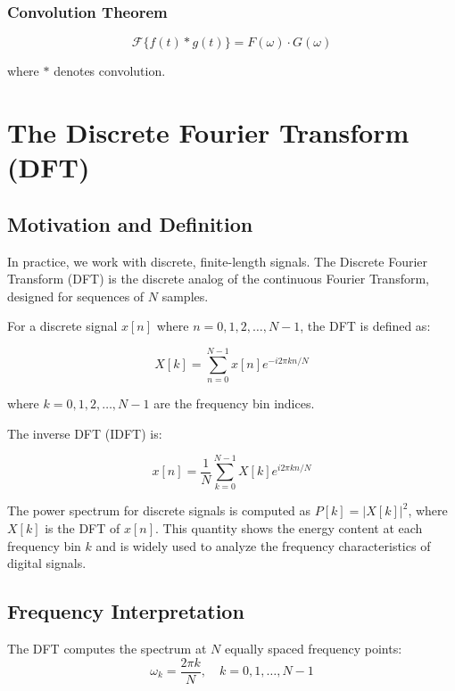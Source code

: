 \documentclass[11pt,a4paper]{article}
\begin{document}
\subsubsection{Convolution Theorem}
\begin{equation}
\mathcal{F}\{f(t) * g(t)\} = F(\omega) \cdot G(\omega)
\end{equation}

where $*$ denotes convolution.

\section{The Discrete Fourier Transform (DFT)}

\subsection{Motivation and Definition}

In practice, we work with discrete, finite-length signals. The Discrete Fourier Transform (DFT) is the discrete analog of the continuous Fourier Transform, designed for sequences of $N$ samples.

For a discrete signal $x[n]$ where $n = 0, 1, 2, \ldots, N-1$, the DFT is defined as:

\begin{equation}
X[k] = \sum_{n=0}^{N-1} x[n] e^{-i 2\pi k n / N}
\end{equation}

where $k = 0, 1, 2, \ldots, N-1$ are the frequency bin indices.

The inverse DFT (IDFT) is:

\begin{equation}
x[n] = \frac{1}{N} \sum_{k=0}^{N-1} X[k] e^{i 2\pi k n / N}
\end{equation}

The power spectrum for discrete signals is computed as $P[k] = |X[k]|^2$, where $X[k]$ is the DFT of $x[n]$. This quantity shows the energy content at each frequency bin $k$ and is widely used to analyze the frequency characteristics of digital signals.

\subsection{Frequency Interpretation}

The DFT computes the spectrum at $N$ equally spaced frequency points:
\begin{equation}
\omega_k = \frac{2\pi k}{N}, \quad k = 0, 1, \ldots, N-1
\end{equation}
\end{document}
